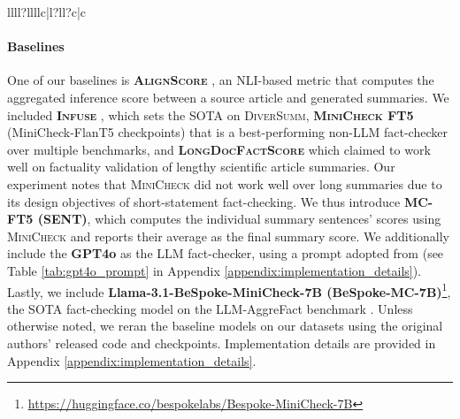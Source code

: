 \begin{table*}[t!]
\begin{tabular}{llll?llllc|l?ll?c|c}
\end{tabular}
\caption{Results for all summarization tasks in \textsc{AggreFact-FtSOTA} (\textsc{AggreFact}), \textsc{DiverSumm}, \textsc{LongSciVerify} (LSV), \textsc{LongEval} and \textsc{LegalSumm} (LegalS).  In \textsc{DiverSumm},  CSM, MNW, QMS, AXV, and GOV refer to ChemSum, MultiNews, QMSUM, ArXiv, and
GovReport. We also report the macro-average of \textsc{DiverSumm} AUC. We highlight the \colorbox{green!10}{best} performed approach where multiple greens indicate systems indistinguishable from the best
according to a paired bootstrap test with p-value < 0.05, and the \underline{second-best} system for each column. The seven baseline models are \textbf{bolded}. Cells with \textsuperscript{$\dagger$} mean the result is {indistinguishable} from the raw baseline according to the bootstrap test. We report the average of 3 runs for GPT4o, given the randomness in LLM inference. 
}\label{tab:aggrefact_diversum_res}
\end{table*}

\paragraph{Baselines}
One of our baselines is \textbf{\textsc{AlignScore}} \cite{zha-etal-2023-alignscore}, an NLI-based metric that computes the aggregated inference score between a source article and generated summaries. We included \textbf{\textsc{Infuse}} \cite{zhang-etal-2024-fine}, which sets the SOTA on \textsc{DiverSumm},  \textbf{\textsc{MiniCheck FT5}} (MiniCheck-FlanT5 checkpoints) \cite{tang2024minicheck} that is a best-performing non-LLM fact-checker over multiple benchmarks, and \textbf{\textsc{LongDocFactScore}} \cite{bishop-etal-2024-longdocfactscore-evaluating} which claimed to work well on factuality validation of lengthy scientific article summaries. Our experiment notes that \textsc{MiniCheck} did not work well over long summaries due to its design objectives of short-statement fact-checking. We thus introduce \textbf{\textsc{MC-FT5 (SENT)}}, which computes the individual summary sentences' scores using \textsc{MiniCheck} and reports their average as the final summary score. We additionally include the \textbf{GPT4o} \cite{openai2024gpt4technicalreport} as the LLM fact-checker, using a prompt adopted from \citet{tang2024minicheck} (see Table \ref{tab:gpt4o_prompt} in Appendix \ref{appendix:implementation_details}). Lastly, we include \textbf{Llama-3.1-BeSpoke-MiniCheck-7B (BeSpoke-MC-7B)}\footnote{\url{https://huggingface.co/bespokelabs/Bespoke-MiniCheck-7B}}, the SOTA fact-checking model on the LLM-AggreFact benchmark \cite{tang2024minicheck}. Unless otherwise noted, we reran the baseline models on our datasets using the original authors' released code and checkpoints. Implementation details are provided in Appendix \ref{appendix:implementation_details}.
